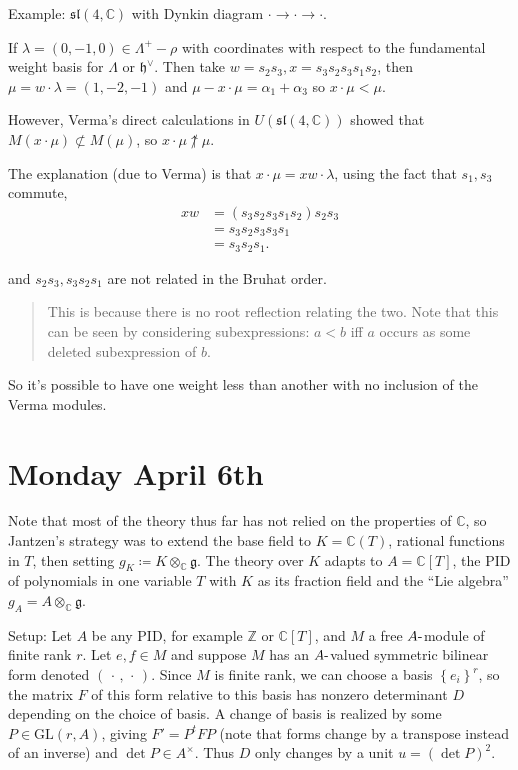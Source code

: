 \documentclass[11pt]{scrartcl}
\theoremstyle{definition}
\theoremstyle{theorem}
\theoremstyle{proof}
\theoremstyle{definition}
\theoremstyle{break}
\theoremstyle{problem}
\DeclarePairedDelimiter\qty{(}{)}
\renewcommand{\qty}[1]{{\left(  {#1} \right)}}
\newcommand{\CC}[0]{{\mathbb{C}}}
\newcommand{\ZZ}[0]{{\mathbb{Z}}}
\newcommand{\Gl}[0]{\mathrm{GL}}
\newcommand{\dash}[0]{{\hbox{-}}}
\newcommand{\definedas}[0]{\coloneqq}
\newcommand{\dual}[0]{^\vee}
\newcommand{\up}[0]{\uparrow}
\newcommand{\lieg}[0]{{\mathfrak{g}}}
\newcommand{\lieh}[0]{{\mathfrak{h}}}
\newcommand{\liesl}[0]{{\mathfrak{sl}}}
\newcommand{\tensor}[0]{\otimes}
\newcommand{\theset}[1]{\left\{{#1}\right\}}
\newcommand{\units}[0]{^{\times}}
\newcommand{\wait}[0]{{\,\cdot\,}}
\renewcommand{\to}[0]{\longrightarrow}
\begin{document}
Example: \(\liesl(4, \CC)\) with Dynkin diagram
\(\cdot \to \cdot \to \cdot\).

If \(\lambda = (0, -1, 0) \in \Lambda^+ - \rho\) with coordinates with
respect to the fundamental weight basis for \(\Lambda\) or
\(\lieh\dual\). Then take \(w = s_2 s_3, x= s_3 s_2 s_3 s_1 s_2\), then
\(\mu = w\cdot \lambda = (1, -2, -1)\) and
\(\mu - x\cdot \mu = \alpha_1 + \alpha_3\) so \(x\cdot \mu < \mu\).

However, Verma's direct calculations in \(U(\liesl(4, \CC))\) showed
that \(M(x\cdot \mu) \not\subset M(\mu)\), so
\(x\cdot \mu \not\up \mu\).

The explanation (due to Verma) is that \(x\cdot \mu = xw\cdot \lambda\),
using the fact that \(s_1, s_3\) commute, \begin{align*}
xw &= (s_3 s_2 s_3 s_1 s_2) s_2 s_3 \\
&= s_3 s_2 s_3 s_3 s_1 \\
&= s_3 s_2 s_1
.\end{align*}

and \(s_2 s_3, s_3 s_2 s_1\) are not related in the Bruhat order.

\begin{quote}
This is because there is no root reflection relating the two. Note that
this can be seen by considering subexpressions: \(a < b\) iff \(a\)
occurs as some deleted subexpression of \(b\).
\end{quote}

So it's possible to have one weight less than another with no inclusion
of the Verma modules.

\hypertarget{monday-april-6th}{%
\section{Monday April 6th}\label{monday-april-6th}}

Note that most of the theory thus far has not relied on the properties
of \(\CC\), so Jantzen's strategy was to extend the base field to
\(K = \CC(T)\), rational functions in \(T\), then setting
\(g_K \definedas K \tensor_\CC \lieg\). The theory over \(K\) adapts to
\(A = \CC[T]\), the PID of polynomials in one variable \(T\) with \(K\)
as its fraction field and the ``Lie algebra''
\(g_A = A \tensor_\CC \lieg\).

Setup: Let \(A\) be any PID, for example \(\ZZ\) or \(\CC[T]\), and
\(M\) a free \(A\dash\)module of finite rank \(r\). Let \(e, f\in M\)
and suppose \(M\) has an \(A\dash\)valued symmetric bilinear form
denoted \((\wait, \wait)\). Since \(M\) is finite rank, we can choose a
basis \(\theset{e_i}^r\), so the matrix \(F\) of this form relative to
this basis has nonzero determinant \(D\) depending on the choice of
basis. A change of basis is realized by some \(P \in \Gl(r, A)\), giving
\(F' = P^t F P\) (note that forms change by a transpose instead of an
inverse) and \(\det P \in A\units\). Thus \(D\) only changes by a unit
\(u = \qty{\det P}^2\).
\end{document}
